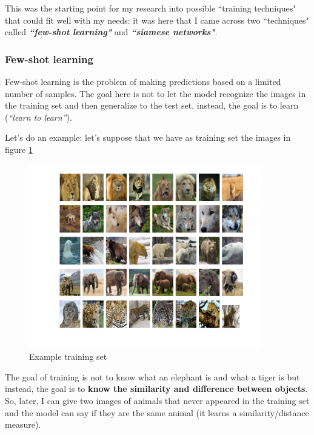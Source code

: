 \documentclass{article}
\begin{document}
This was the starting point for my research into possible ``training techniques" that could fit well with my needs: it was here that I came across two ``techniques" called \textbf{\textit{``few-shot learning"}} and \textbf{\textit{``siamese networks"}}.

\subsubsection{Few-shot learning}
Few-shot learning is the problem of making predictions based on a limited number of samples.
The goal here is not to let the model recognize the images in the training set and then generalize to the test set, instead, the goal is to learn (\textit{“learn to learn”}).

\bigskip
Let's do an example: let's suppose that we have as training set the images in figure \ref{fig:exampleTS}

\begin{figure}[H]
    \centering
    \includegraphics[width=4in]{imgs/Wild_Anima_dataset.png}
    \caption{Example training set}
    \label{fig:exampleTS}
\end{figure}

The goal of training is not to know what an elephant is and what a tiger is but instead, the goal is to \textbf{know the similarity and difference between objects}. So, later, I can give two images of animals that never appeared in the training set and the model can say if they are the same animal (it learns a similarity/distance measure).
\end{document}
